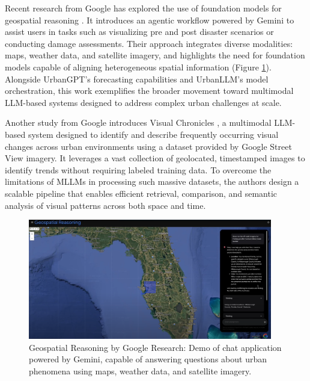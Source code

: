Recent research from Google has explored the use of foundation models for geospatial reasoning \citep{2025GoogleGeospatialReasoning}. It introduces an agentic workflow powered by Gemini to assist users in tasks such as visualizing pre and post disaster scenarios or conducting damage assessments. Their approach integrates diverse modalities: maps, weather data, and satellite imagery, and highlights the need for foundation models capable of aligning heterogeneous spatial information (Figure \ref{fig:geospatial_reasoning}). Alongside UrbanGPT's forecasting capabilities and UrbanLLM's model orchestration, this work exemplifies the broader movement toward multimodal LLM-based systems designed to address complex urban challenges at scale.

Another study from Google introduces Visual Chronicles \citep{Deng2025VisualChronicles}, a multimodal LLM-based system designed to identify and describe frequently occurring visual changes across urban environments using a dataset provided by Google Street View imagery. It leverages a vast collection of geolocated, timestamped images to identify trends without requiring labeled training data. To overcome the limitations of MLLMs in processing such massive datasets, the authors design a scalable pipeline that enables efficient retrieval, comparison, and semantic analysis of visual patterns across both space and time.

\begin{figure}[hbtp]
  \centering
  \includegraphics[width=0.95\textwidth]{images/geospatial_reasoning.png}
  \caption{Geospatial Reasoning by Google Research: Demo of chat application powered by Gemini, capable of answering questions about urban phenomena using maps, weather data, and satellite imagery.}
  \label{fig:geospatial_reasoning}
\end{figure}



